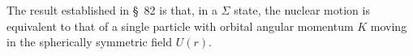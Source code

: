 The result established in \S~82 is that, in a $\Sigma$ state, the nuclear motion is equivalent to that of a single particle with orbital angular momentum $K$ moving in the spherically symmetric field $U(r)$.
